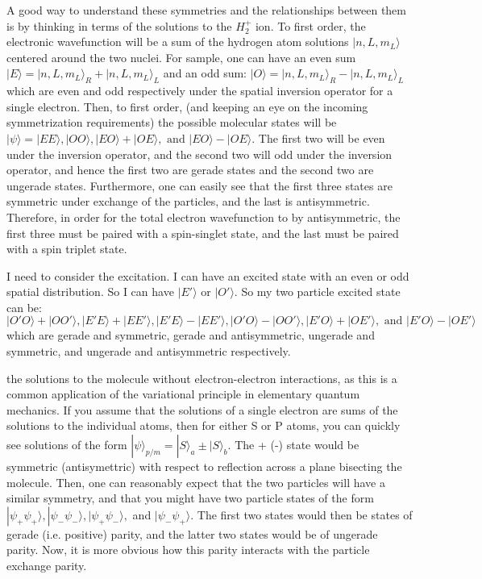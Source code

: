 \documentclass[prl, longbibliography]{revtex4-2}
\begin{document}
A good way to understand these symmetries and the relationships between them is by thinking in terms of the solutions to the $H_2^+$ ion. To first order, the electronic wavefunction will be a sum of the hydrogen atom solutions $|n,L,m_L\rangle$ centered around the two nuclei. For sample, one can have an even sum $|E\rangle=|n,L,m_L\rangle_R + |n,L,m_L\rangle_L$ and an odd sum: $|O\rangle=|n,L,m_L\rangle_R - |n,L,m_L\rangle_L$ which are even and odd respectively under the spatial inversion operator for a single electron. Then, to first order, (and keeping an eye on the incoming symmetrization requirements) the possible molecular states will be $|\psi\rangle=|EE\rangle, |OO\rangle,|EO\rangle+|OE\rangle,\text{ and } |EO\rangle-|OE\rangle$. The first two will be even under the inversion operator, and the second two will odd under the inversion operator, and hence the first two are gerade states and the second two are ungerade states. Furthermore, one can easily see that the first three states are symmetric under exchange of the particles, and the last is antisymmetric. Therefore, in order for the total electron wavefunction to by antisymmetric, the first three must be paired with a spin-singlet state, and the last must be paired with a spin triplet state. 

I need to consider the excitation. I can have an excited state with an even or odd spatial distribution. So I can have $|E'\rangle$ or $|O'\rangle$. So my two particle excited state can be:
$$
|O'O\rangle+|OO'\rangle, |E'E\rangle+|EE'\rangle,  |E'E\rangle-|EE'\rangle,|O'O\rangle-|OO'\rangle, |E'O\rangle+|OE'\rangle, \text{ and } |E'O\rangle-|OE'\rangle
$$
which are gerade and symmetric, gerade and antisymmetric, ungerade and symmetric, and ungerade and antisymmetric respectively. 


the solutions to the molecule without electron-electron interactions, as this is a common application of the variational principle in elementary quantum mechanics. If you assume that the solutions of a single electron are sums of the solutions to the individual atoms, then for either S or P atoms, you can quickly see solutions of the form $|\psi\rangle_{p/m}=|S\rangle _a \pm |S\rangle _b$. The + (-) state would be symmetric (antisymettric) with respect to reflection across a plane bisecting the molecule. Then, one can reasonably expect that the two particles will have a similar symmetry, and that you might have two particle states of the form $|\psi_+\psi_+\rangle,|\psi_-\psi_-\rangle, |\psi_+\psi_-\rangle, $ and $|\psi_-\psi_+\rangle$. The first two states would then be states of gerade (i.e. positive) parity, and the latter two states would be of ungerade parity. Now, it is more obvious how this parity interacts with the particle exchange parity. 
\end{document}
